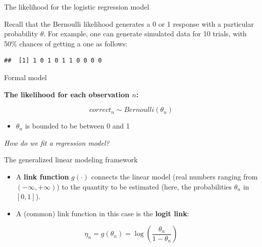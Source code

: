 \documentclass[12pt,ignorenonframetext,aspectratio=169]{beamer}
\newenvironment{Shaded}{\begin{snugshade}}{\end{snugshade}}
\newcommand{\CommentTok}[1]{\textcolor[rgb]{0.56,0.35,0.01}{\textit{#1}}}
\newcommand{\DataTypeTok}[1]{\textcolor[rgb]{0.13,0.29,0.53}{#1}}
\newcommand{\DecValTok}[1]{\textcolor[rgb]{0.00,0.00,0.81}{#1}}
\newcommand{\FloatTok}[1]{\textcolor[rgb]{0.00,0.00,0.81}{#1}}
\newcommand{\KeywordTok}[1]{\textcolor[rgb]{0.13,0.29,0.53}{\textbf{#1}}}
\newcommand{\NormalTok}[1]{#1}
\newcommand{\OperatorTok}[1]{\textcolor[rgb]{0.81,0.36,0.00}{\textbf{#1}}}
\newcommand{\StringTok}[1]{\textcolor[rgb]{0.31,0.60,0.02}{#1}}
\providecommand{\tightlist}{%
  \setlength{\itemsep}{0pt}\setlength{\parskip}{0pt}}
\begin{document}
\begin{frame}[fragile]{The likelihood for the logistic regression model}
\protect\hypertarget{the-likelihood-for-the-logistic-regression-model}{}

Recall that the Bernoulli likelihood generates a 0 or 1 response with a particular probability \(\theta\). For example, one can generate simulated data for 10 trials, with 50\% chances of getting a one as follows:

\small

\begin{Shaded}
\end{Shaded}

\begin{verbatim}
##  [1] 1 0 1 0 1 1 0 0 0 0
\end{verbatim}

\normalsize

\end{frame}

\begin{frame}{Formal model}
\protect\hypertarget{formal-model-2}{}

\textbf{The likelihood for each observation \(n\):}

\begin{equation}
correct_n \sim Bernoulli(\theta_n)
\label{eq:bernoullilik}
\end{equation}

\begin{itemize}
\tightlist
\item
  \(\theta_n\) is bounded to be between 0 and 1
\end{itemize}

\emph{How do we fit a regression model?}

\end{frame}

\begin{frame}{The generalized linear modeling framework}
\protect\hypertarget{the-generalized-linear-modeling-framework}{}

\begin{itemize}
\tightlist
\item
  A \textbf{link function} \(g(\cdot)\) connects the linear model (real numbers ranging from \((-\infty,+\infty)\)) to the quantity to be estimated (here, the probabilities \(\theta_n\) in \([0,1]\)).
\item
  A (common) link function in this case is the \textbf{logit link}:
\end{itemize}

\begin{equation}
\eta_n = g(\theta_n) = \log\left(\frac{\theta_n}{1-\theta_n}\right)
\end{equation}

\end{frame}
\end{document}
